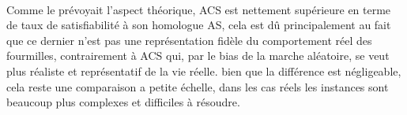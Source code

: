 \paragraph{}
Comme le prévoyait l'aspect théorique, ACS est nettement supérieure en terme de taux de satisfiabilité à son homologue AS, cela est dû principalement au fait que ce dernier n'est pas une représentation fidèle  du comportement réel des fourmilles, contrairement à ACS qui, par le bias de la marche aléatoire, se veut plus réaliste et représentatif de la vie réelle. bien que la différence est négligeable, cela reste une comparaison a petite échelle, dans les cas réels les instances sont beaucoup plus complexes et difficiles à résoudre.

